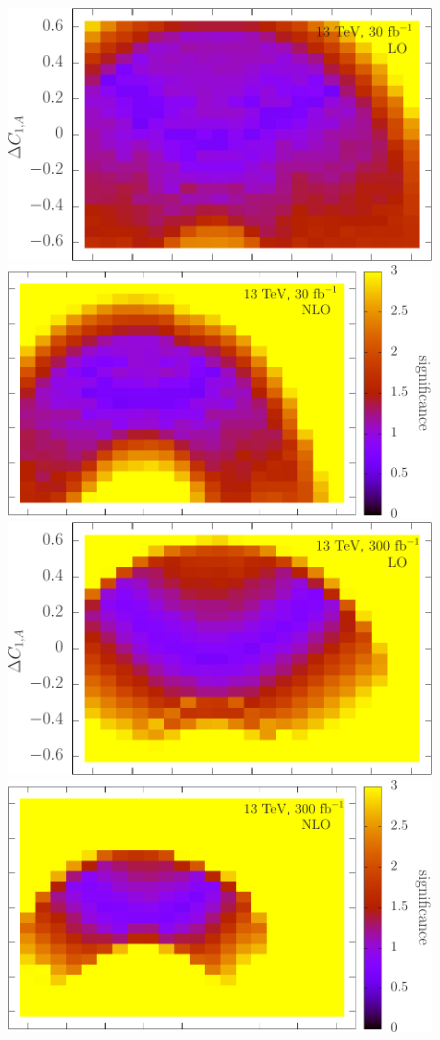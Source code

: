 \documentclass{JHEP3}
\begin{document}
\begin{figure}[t]
\includegraphics[scale=0.503]{LHC_53_LLSign_13LO30.pdf} 
\includegraphics[scale=0.5]{LHC_53_LLSign_13NLO30.pdf} 
\\
\includegraphics[scale=0.503]{LHC_53_LLSign_13LO300.pdf} 
\includegraphics[scale=0.5]{LHC_53_LLSign_13NLO300.pdf} 

\end{figure}
\end{document}
